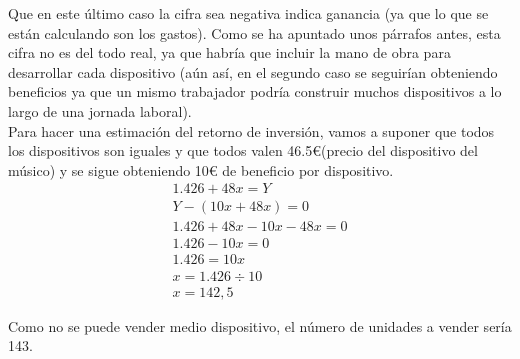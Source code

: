 Que en este último caso la cifra sea negativa indica ganancia (ya que lo que se están
calculando son los gastos). Como se ha apuntado unos párrafos antes, esta cifra no es
del todo real, ya que habría que incluir la mano de obra para desarrollar cada dispositivo
(aún así, en el segundo caso se seguirían obteniendo beneficios ya que un mismo trabajador
podría construir muchos dispositivos a lo largo de una jornada laboral).\\


Para hacer una estimación del retorno de inversión, vamos a suponer que todos los dispositivos son
iguales y que todos valen 46.5\euro (precio del dispositivo del músico) y se sigue obteniendo 10\euro
de beneficio por dispositivo.
\begin{gather*}
  1.426 + 48x = Y \\
  Y - (10x + 48x) = 0 \\
  1.426 + 48x - 10x - 48x = 0 \\
  1.426 - 10 x = 0 \\
  1.426 = 10x \\
  x = 1.426 \div 10 \\
  x = 142,5
\end{gather*}

Como no se puede vender medio dispositivo, el número de unidades a vender sería 143.
